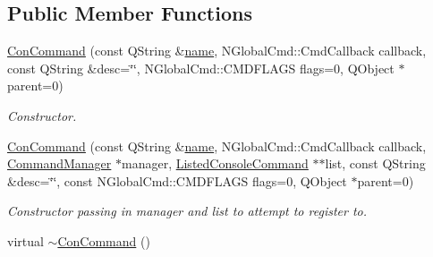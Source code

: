 \subsection*{Public Member Functions}
\begin{DoxyCompactItemize}
\item 
\hyperlink{class_con_command_abd8a6c4780d77aa59f46233ac818e0e1}{Con\-Command} (const Q\-String \&\hyperlink{class_base_console_command_a2f21764f46a3864a362eae2e3396e363}{name}, N\-Global\-Cmd\-::\-Cmd\-Callback callback, const Q\-String \&desc=\char`\"{}\char`\"{}, N\-Global\-Cmd\-::\-C\-M\-D\-F\-L\-A\-G\-S flags=0, Q\-Object $\ast$parent=0)
\begin{DoxyCompactList}\small\item\em Constructor. \end{DoxyCompactList}\item 
\hyperlink{class_con_command_a8b048f3b99fdd95b2c4e26c2a0a117be}{Con\-Command} (const Q\-String \&\hyperlink{class_base_console_command_a2f21764f46a3864a362eae2e3396e363}{name}, N\-Global\-Cmd\-::\-Cmd\-Callback callback, \hyperlink{class_command_manager}{Command\-Manager} $\ast$manager, \hyperlink{class_listed_console_command}{Listed\-Console\-Command} $\ast$$\ast$list, const Q\-String \&desc=\char`\"{}\char`\"{}, const N\-Global\-Cmd\-::\-C\-M\-D\-F\-L\-A\-G\-S flags=0, Q\-Object $\ast$parent=0)
\begin{DoxyCompactList}\small\item\em Constructor passing in manager and list to attempt to register to. \end{DoxyCompactList}\item 
\hypertarget{class_con_command_a90b9ab62350b55966e959d88caa97c84}{virtual \hyperlink{class_con_command_a90b9ab62350b55966e959d88caa97c84}{$\sim$\-Con\-Command} ()}\label{class_con_command_a90b9ab62350b55966e959d88caa97c84}


\end{DoxyCompactItemize}
